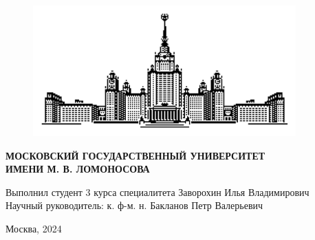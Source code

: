 \documentclass[a4paper,12pt]{extarticle}
\begin{document}
\begin{titlepage} 
    \begin{figure}[!htb]
	\centering
	\includegraphics[width=0.9\textwidth]{Sketch_MSU.png}
	\label{fig:Sketch_MSU}
    \end{figure}
    \begin{center}
    \textbf{\Large  МОСКОВСКИЙ ГОСУДАРСТВЕННЫЙ УНИВЕРСИТЕТ \\
ИМЕНИ М. В. ЛОМОНОСОВА} 
    \end{center}
    \begin{center}
    \end{center}
    \begin{center}
    \end{center}
    \begin{center}
    \end{center}
    \begin{center}
    \end{center}
    \begin{center}
    
    \end{center}
    \vspace{6cm}
    \begin{flushright}
    Выполнил студент 3 курса специалитета Заворохин Илья Владимирович\\
    Научный руководитель: к. ф-м. н. Бакланов Петр Валерьевич
    \end{flushright}
    \vspace{3cm}
    \begin{center}
        Москва, 2024
    \end{center}
\end{titlepage} 


\date{\today}
\tableofcontents
\newpage
\end{document}
